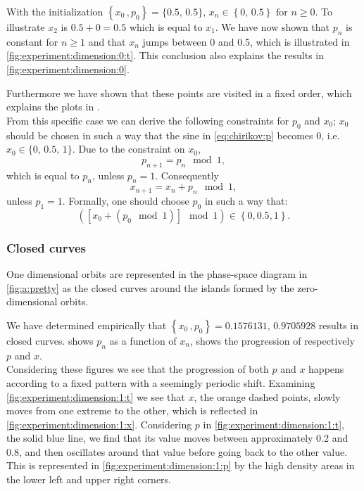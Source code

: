 With the initialization $\left\{x_0\,, p_0 \right\} = \{{0.5},\,{0.5}\}$, $x_{n} \in \left\{0,\, 0.5 \right\} \text{ for } n \geq 0$. To illustrate $x_2$ is $0.5 + 0 = 0.5$ which is equal to $x_1$. We have now shown that $p_n$ is constant for $n \geq 1$ and that $x_n$ jumps between 0 and 0.5, which is illustrated in \cref{fig:experiment:dimension:0:t}. This conclusion also explains the results in \cref{fig:experiment:dimension:0}. 

Furthermore we have shown that these points are visited in a fixed order, which explains the plots in .\\

From this specific case we can derive the following constraints for $p_0$ and $x_0$; $x_0$ should be chosen in such a way that the sine in \cref{eq:chirikov:p} becomes 0, i.e. $x_0 \in \{0,\, 0.5,\, 1\}$. Due to the constraint on $x_0$,
\begin{equation*}
p_{n + 1} = p_{n} \mod 1,
\end{equation*}
	which is equal to $p_n$, unless $p_n = 1$. Consequently
	\begin{equation*}
	x_{n + 1} = x_n + p_n \mod 1,
	\end{equation*}
unless $p_1 = 1$. Formally, one should choose $p_0$ in such a way that:
\begin{equation*}
	\left( \left[ x_0 + (p_0 \mod 1)\right] \mod 1 \right) \in \left\{0, 0.5, 1\right\}.
\end{equation*}

\subsubsection{Closed curves}
\label{sss:experiment:a:closed}
One dimensional orbits are represented in the phase-space diagram in \cref{fig:a:pretty} as the closed curves around the islands formed by the zero-dimensional orbits.

We have determined empirically that $\left\{x_0\,, p_0 \right\} = {\num{0.1576131},\,\num{0.9705928}}$ results in closed curves.  shows $p_n$ as a function of $x_n$,  shows the progression of respectively $p$ and $x$.\\

Considering these figures we see that the progression of both $p$ and $x$ happens according to a fixed pattern with a seemingly periodic shift. Examining \cref{fig:experiment:dimension:1:t} we see that $x$, the orange dashed points, slowly moves from one extreme to the other, which is reflected in \cref{fig:experiment:dimension:1:x}. Considering $p$ in \cref{fig:experiment:dimension:1:t}, the solid blue line, we find that its value moves between approximately 0.2 and 0.8, and then oscillates around that value before going back to the other value. This is represented in \cref{fig:experiment:dimension:1:p} by the high density areas in the lower left and upper right corners.

